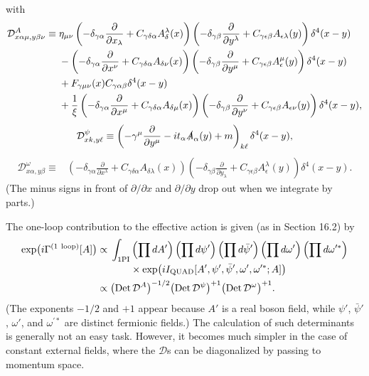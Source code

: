 with
\begin{align}
\mathcal D^A_{x\alpha\mu,y\beta\nu}\equiv{}&
\eta_{\mu\nu}
\left(-\delta_{\gamma\alpha}\frac{\partial}{\partial x_\lambda}
+C_{\gamma\delta\alpha}A_\delta^\lambda(x)\right)
\left(-\delta_{\gamma\beta}\frac{\partial}{\partial y^\lambda}
+C_{\gamma\epsilon\beta}A_{\epsilon\lambda}(y)\right)\delta^4(x-y)
\notag\\
&-\left(-\delta_{\gamma\alpha}\frac{\partial}{\partial x^\nu}
+C_{\gamma\delta\alpha}A_{\delta\nu}(x)\right)
\left(-\delta_{\gamma\beta}\frac{\partial}{\partial y^\mu}
+C_{\gamma\epsilon\beta}A_\epsilon^\mu(y)\right)\delta^4(x-y)
\notag\\
&+F_{\gamma\mu\nu}(x)C_{\gamma\alpha\beta}\delta^4(x-y)
\notag\\
&+\frac1\xi
\left(-\delta_{\gamma\alpha}\frac{\partial}{\partial x^\mu}
+C_{\gamma\delta\alpha}A_{\delta\mu}(x)\right)
\left(-\delta_{\gamma\beta}\frac{\partial}{\partial y^\nu}
+C_{\gamma\epsilon\beta}A_{\epsilon\nu}(y)\right)\delta^4(x-y),
\label{eq:17.5.7}
\end{align}
\begin{equation}
\mathcal D^\psi_{xk,y\ell}\equiv
\left(-\gamma^\mu\frac{\partial}{\partial y^\mu}
-it_\alpha\sl{A}_\alpha(y)+m\right)_{k\ell}\delta^4(x-y),
\label{eq:17.5.8}
\end{equation}
\begin{align}
\mathcal D^\omega_{x\alpha,y\beta}\equiv{}&
\left(-\delta_{\gamma\alpha}\frac{\partial}{\partial x^\lambda}
+C_{\gamma\delta\alpha}A_{\delta\lambda}(x)\right)
\left(-\delta_{\gamma\beta}\frac{\partial}{\partial y_\lambda}
+C_{\gamma\epsilon\beta}A_\epsilon^\lambda(y)\right)\delta^4(x-y).
\label{eq:17.5.9}
\end{align}
(The minus signs in front of $\partial/\partial x$ and $\partial/\partial y$
drop out when we integrate by parts.)

The one-loop contribution to the effective action is given (as in Section
16.2) by
\begin{align}
\exp\bigl(i\Gamma^{(1\ \mathrm{loop})}[A]\bigr)\propto{}&
\int_{1\mathrm{PI}}
\left(\prod dA'\right)\left(\prod d\psi'\right)
\left(\prod d\bar\psi'\right)\left(\prod d\omega'\right)
\left(\prod d\omega^{\prime *}\right)
\notag\\[-2pt]
&\qquad\times
\exp\bigl(iI_{\mathrm{QUAD}}[A',\psi',\bar\psi',\omega',
\omega^{\prime *};A]\bigr)
\notag\\
\propto{}&
\bigl(\operatorname{Det}\mathcal D^A\bigr)^{-1/2}
\bigl(\operatorname{Det}\mathcal D^\psi\bigr)^{+1}
\bigl(\operatorname{Det}\mathcal D^\omega\bigr)^{+1}.
\label{eq:17.5.10}
\end{align}
(The exponents $-1/2$ and $+1$ appear because $A'$ is a real boson field,
while $\psi'$, $\bar\psi'$, $\omega'$, and $\omega^{\prime *}$ are distinct
fermionic fields.) The calculation of such determinants is generally not
an easy task. However, it becomes much simpler in the case of constant
external fields, where the $\mathcal D$s can be diagonalized by passing to
momentum space.


